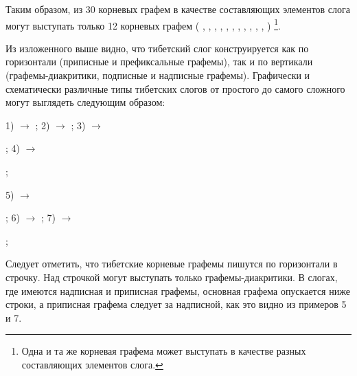Таким образом, из 30 корневых графем в качестве составляющих элементов слога могут выступать только 12 корневых графем ( , , , , , , , , , , ,  ) \footnote[10]{Одна и та же корневая графема может выступать в качестве разных составляющих элементов слога.}.

Из изложенного выше видно, что тибетский слог конструируется как по горизонтали (приписные и префиксальные графемы), так и по вертикали (графемы-диакритики, подписные и надписные графемы). Графически и схематически различные типы тибетских слогов от простого до самого сложного могут выглядеть следующим образом:

1)  $\rightarrow$ ; 2)  $\rightarrow$   ;
3)  $\rightarrow$
;
4)  $\rightarrow$
;

5)  $\rightarrow$
;
6)  $\rightarrow$   ;
7)  $\rightarrow$
;

Следует отметить, что тибетские корневые графемы пишутся по горизонтали в строчку. Над строчкой могут выступать только графемы-диакритики. В слогах, где имеются надписная и приписная графемы, основная графема опускается ниже строки, а приписная графема следует за надписной, как это видно из примеров 5 и 7.

